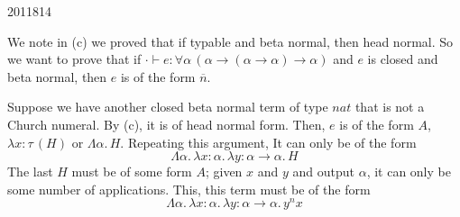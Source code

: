 \documentclass[10pt,\jkfside,a4paper]{article}
\begin{document}
\begin{examquestion}{2011}{8}{14}
\begin{enumerate}
{                We note in (c) we proved that if typable and beta normal, then head normal. So we want to prove that if $\cdot \vdash e : \forall \alpha\, (\alpha \to (\alpha \to \alpha) \to \alpha)$ and $e$ is closed and beta normal, then $e$ is of the form $\overline{n}$.

                Suppose we have another closed beta normal term of type $\mathit{nat}$ that is not a Church numeral. By (c), it is of head normal form. Then, $e$ is of the form $A$, $\lambda x : \tau\, (H)$ or $\Lambda \alpha.\, H$. Repeating this argument, It can only be of the form
                \[
                    \Lambda \alpha.\, \lambda x : \alpha.\, \lambda y : \alpha \to \alpha.\, H
                \]
                The last $H$ must be of some form $A$; given $x$ and $y$ and output $\alpha$, it can only be some number of applications. This, this term must be of the form 
                \[
                    \Lambda \alpha.\, \lambda x : \alpha.\, \lambda y : \alpha \to \alpha.\, y^n x 
                \]
            }

    \end{enumerate}

\end{examquestion}
\end{document}
